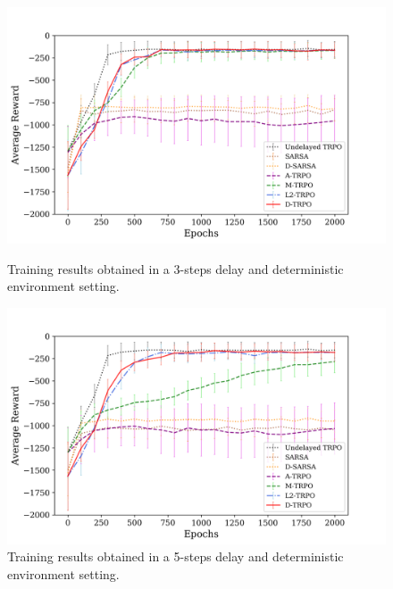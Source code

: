             \begin{figure}[hbtp]
                \centering
                \includegraphics[width=15cm, keepaspectratio]{images/results/delay3_comparisons_1.png}
                \caption{Training results obtained in a 3-steps delay and deterministic environment setting.}
                \label{fig:results_delay3_1}
                
                \vspace{1.5cm}
                
                \includegraphics[width=15cm, keepaspectratio]{images/results/delay5_comparisons_1.png}
                \caption{Training results obtained in a 5-steps delay and deterministic environment setting.}
                \label{fig:results_delay5_1}
            \end{figure}
            
